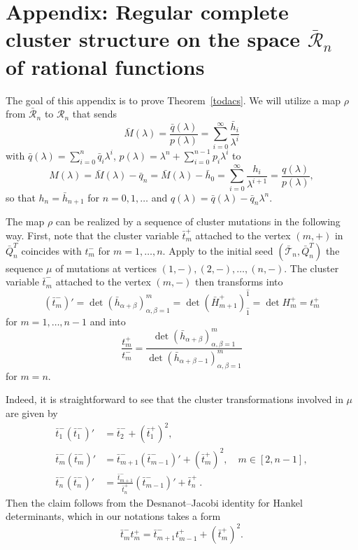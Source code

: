 \documentclass{amsart}
\theoremstyle{definition}
\theoremstyle{remark}
\numberwithin{equation}{section}
\numberwithin{theorem}{section}
\def\RR{{\mathcal R}}
\def\TE{{\mathcal T}}
\begin{document}
\appendix
\renewcommand{\theequation}{A.\arabic{equation}}
\setcounter{equation}{0}
\section*{Appendix: Regular complete cluster structure on the space $\bar \RR_n$ of rational functions}
The goal of this appendix is to prove Theorem~\ref{todacs}. 
We will utilize a map $\rho$ from $\bar \RR_n$ to $\RR_n$ that sends 
\[
\bar M(\lambda) = \frac{\bar q(\lambda)}{p(\lambda)}= \sum_{i=0}^\infty\frac{\bar h_i}{\lambda^i} 
\]
with $\bar q(\lambda)=\sum_{i=0}^{n}\bar q_i\lambda^i$, $p(\lambda)=\lambda^n + \sum_{i=0}^{n-1}p_i\lambda^i$ 
to 
\[
M(\lambda) = \bar M(\lambda) - \bar q_n  = \bar M(\lambda) - \bar h_0 = \sum_{i=0}^\infty\frac{h_i}{\lambda^{i+1}}=\frac{q(\lambda)}{p(\lambda)},
\]
so that $h_n = \bar h_{n+1}$ for $n =0, 1, \ldots$ and $q(\lambda)= \bar q(\lambda) - \bar q_n \lambda^n$.

The map $\rho$ can be realized by a sequence of cluster mutations in the following way. First, note that the cluster variable $\bar t_m^+$ 
attached to the vertex $(m,+)$ in $\bar Q_n^T$ coincides with $t_m^-$ for $m=1,\ldots, n$.
 Apply to the initial seed $(\bar\TE_n, \bar Q_n^T)$ the sequence  $\mu$ of mutations  at vertices 
$(1,-), (2,-), \ldots, (n,-)$. The cluster variable $\bar t_m^-$  attached to the vertex $(m,-)$ then transforms into 
\[
(\bar t_m^-)'=\det (\bar h_{\alpha+\beta})_{\alpha,\beta=1}^m =
\det (\bar H_{m+1}^+)_{\hat 1}^{\hat 1}=
 \det H_m^+ = t_m^+
\] 
for $m=1,\ldots, n-1$ and into 
\[
\frac{t_m^+}{t_m^-} =
\frac{\det (\bar h_{\alpha+\beta})_{\alpha,\beta=1}^m}{\det (\bar h_{\alpha+\beta-1})_{\alpha,\beta=1}^m} 
\]
for $m=n$. 

Indeed, it is straightforward to see that the cluster transformations involved in $\mu$ are given by
\begin{align*}
\bar t_1^- (\bar t_1^-)'&= \bar t_2^- + (\bar t_1^+)^2 , \\
\bar t_m^- (\bar t_m^-)'&= \bar t_{m+1}^-(\bar t_{m-1}^-)' + (\bar t_m^+)^2,\quad  m\in[2, n-1],\\
\bar t_n^- (\bar t_n^-)'&= \frac{\bar t_{m+1}^-}{\bar t_n^+}(\bar t_{m-1}^-)' + \bar t_n^+\ .
\end{align*}
Then the claim follows from the Desnanot--Jacobi identity for Hankel determinants, which in our notations takes a form
\[
\bar t_m^- t_m^+ =   \bar t_{m+1}^-t_{m-1}^+ +  (\bar t_m^+)^2.
\]
\end{document}
